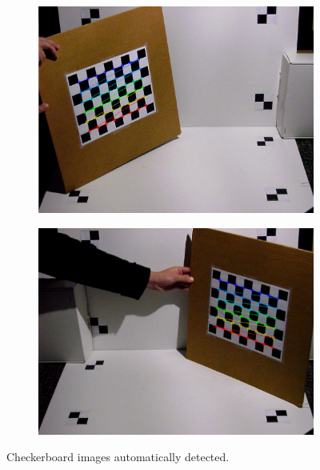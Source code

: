 \documentclass[10pt]{article}
\begin{document}
\begin{figure}[h!]
  \centering
  \begin{subfigure}[b]{0.47\linewidth}
           \centering
            \includegraphics[width=\linewidth]{calib1.jpg}
           
           
    \end{subfigure}
    \begin{subfigure}[b]{0.47\linewidth}
           \centering
            \includegraphics[width=\linewidth]{calib2.jpg}
            
           
    \end{subfigure}
    \caption{Checkerboard images automatically detected.}
 \end{figure}
\end{document}
